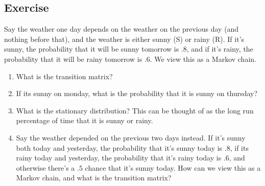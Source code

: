 \documentclass{article}
\newcounter{counter}
\newcommand{\Exercise}{Exercise \stepcounter{counter}\thecounter}
\begin{document}

\subsection*{\Exercise}
  Say the weather one day depends on the weather on the previous day (and
  nothing before that), and the
  weather is either sunny (S) or rainy (R). If it's sunny, the probability
  that it will be sunny tomorrow is $.8$, and if it's rainy, the probability
  that it will be rainy tomorrow is $.6$. We view this as a Markov chain.
  \begin{enumerate}[label=(\alph*)]
    \item What is the transition matrix?
    \item If its sunny on monday, what is the probability that it is sunny
      on thursday?
    \item What is the stationary distribution? This can be thought of as the
      long run percentage of time that it is sunny or rainy.
    \item Say the weather depended on the previous two days instead. If it's
      sunny both today and yesterday, the probability that it's sunny today
      is $.8$, if its rainy today and yesterday, the probability that it's
      rainy today is $.6$, and otherwise there's a $.5$ chance that it's
      sunny today. How can we view this as a Markov chain, and what is the
      transition matrix?
  \end{enumerate}
\end{document}
